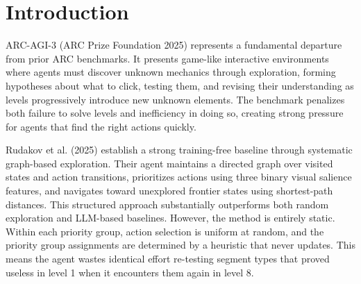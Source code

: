 \documentclass{article}
\begin{document}
\begin{abstract}
We extend the state-of-the-art graph-based exploration approach for ARC-AGI-3 (Rudakov et al., 2025) by replacing its hand-coded visual salience heuristic with five learned priority functions trained online from a dense binary transition reward. The heuristic assigns each visual segment to one of five priority groups using fixed binary rules that cannot adapt as levels progress. We redesign the segment feature representation from three binary indicators to four continuous features: HSV color saturation, a Gaussian closeness-to-medium-size score, status-bar membership, and a log-count of twin segments. We warm-start all learned agents to approximately recover the heuristic's ordering before any training begins. We compare five algorithms: REINFORCE, First-Order MAML (FOMAML), a two-layer MLP, Soft Actor-Critic (SAC), and Proximal Policy Optimization (PPO). In 45-minute evaluations on vc33, FOMAML achieves a 7.5x improvement in score over the baseline, REINFORCE achieves a 4.8x improvement, and SAC achieves a 4.1x improvement. PPO and the MLP underperform the baseline in this time window due to insufficient data for their sample requirements. These results establish that fast per-level meta-adaptation is the most effective inductive bias for this environment, and that learned continuous feature representations outperform hard-coded binary ones even with simple linear models.
\end{abstract}

\section{Introduction}
ARC-AGI-3 (ARC Prize Foundation 2025) represents a fundamental departure from prior ARC benchmarks. It presents game-like interactive environments where agents must discover unknown mechanics through exploration, forming hypotheses about what to click, testing them, and revising their understanding as levels progressively introduce new unknown elements. The benchmark penalizes both failure to solve levels and inefficiency in doing so, creating strong pressure for agents that find the right actions quickly.

Rudakov et al. (2025) establish a strong training-free baseline through systematic graph-based exploration. Their agent maintains a directed graph over visited states and action transitions, prioritizes actions using three binary visual salience features, and navigates toward unexplored frontier states using shortest-path distances. This structured approach substantially outperforms both random exploration and LLM-based baselines. However, the method is entirely static. Within each priority group, action selection is uniform at random, and the priority group assignments are determined by a heuristic that never updates. This means the agent wastes identical effort re-testing segment types that proved useless in level 1 when it encounters them again in level 8.
\end{document}

